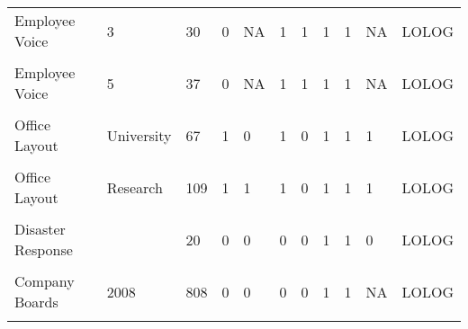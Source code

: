 \documentclass[
]{statsoc}
\begin{document}
\begin{longtable}[t]{lllllllllll}
Employee Voice & 3 & 30 & 0 & NA & 1 & 1 & 1 & 1 & NA & LOLOG\\
\cellcolor{gray!6}{Employee Voice} & \cellcolor{gray!6}{4} & \cellcolor{gray!6}{31} & \cellcolor{gray!6}{0} & \cellcolor{gray!6}{NA} & \cellcolor{gray!6}{1} & \cellcolor{gray!6}{1} & \cellcolor{gray!6}{1} & \cellcolor{gray!6}{1} & \cellcolor{gray!6}{NA} & \cellcolor{gray!6}{LOLOG}\\
Employee Voice & 5 & 37 & 0 & NA & 1 & 1 & 1 & 1 & NA & LOLOG\\
\addlinespace
\cellcolor{gray!6}{Employee Voice} & \cellcolor{gray!6}{6} & \cellcolor{gray!6}{39} & \cellcolor{gray!6}{0} & \cellcolor{gray!6}{NA} & \cellcolor{gray!6}{1} & \cellcolor{gray!6}{1} & \cellcolor{gray!6}{1} & \cellcolor{gray!6}{1} & \cellcolor{gray!6}{NA} & \cellcolor{gray!6}{LOLOG}\\
Office Layout & University & 67 & 1 & 0 & 1 & 0 & 1 & 1 & 1 & LOLOG\\
\cellcolor{gray!6}{Office Layout} & \cellcolor{gray!6}{University} & \cellcolor{gray!6}{69} & \cellcolor{gray!6}{1} & \cellcolor{gray!6}{1} & \cellcolor{gray!6}{1} & \cellcolor{gray!6}{0} & \cellcolor{gray!6}{1} & \cellcolor{gray!6}{1} & \cellcolor{gray!6}{1} & \cellcolor{gray!6}{LOLOG}\\
Office Layout & Research & 109 & 1 & 1 & 1 & 0 & 1 & 1 & 1 & LOLOG\\
\cellcolor{gray!6}{Office Layout} & \cellcolor{gray!6}{Publisher} & \cellcolor{gray!6}{119} & \cellcolor{gray!6}{1} & \cellcolor{gray!6}{0} & \cellcolor{gray!6}{1} & \cellcolor{gray!6}{0} & \cellcolor{gray!6}{1} & \cellcolor{gray!6}{1} & \cellcolor{gray!6}{1} & \cellcolor{gray!6}{LOLOG}\\
\addlinespace
Disaster Response &  & 20 & 0 & 0 & 0 & 0 & 1 & 1 & 0 & LOLOG\\
\cellcolor{gray!6}{Company Boards} & \cellcolor{gray!6}{2007} & \cellcolor{gray!6}{808} & \cellcolor{gray!6}{0} & \cellcolor{gray!6}{0} & \cellcolor{gray!6}{0} & \cellcolor{gray!6}{0} & \cellcolor{gray!6}{1} & \cellcolor{gray!6}{1} & \cellcolor{gray!6}{NA} & \cellcolor{gray!6}{LOLOG}\\
Company Boards & 2008 & 808 & 0 & 0 & 0 & 0 & 1 & 1 & NA & LOLOG\\
\cellcolor{gray!6}{Company Boards} & \cellcolor{gray!6}{2009} & \cellcolor{gray!6}{808} & \cellcolor{gray!6}{0} & \cellcolor{gray!6}{0} & \cellcolor{gray!6}{0} & \cellcolor{gray!6}{0} & \cellcolor{gray!6}{1} & \cellcolor{gray!6}{1} & \cellcolor{gray!6}{NA} & \cellcolor{gray!6}{LOLOG}\\

\end{longtable}
\end{document}
